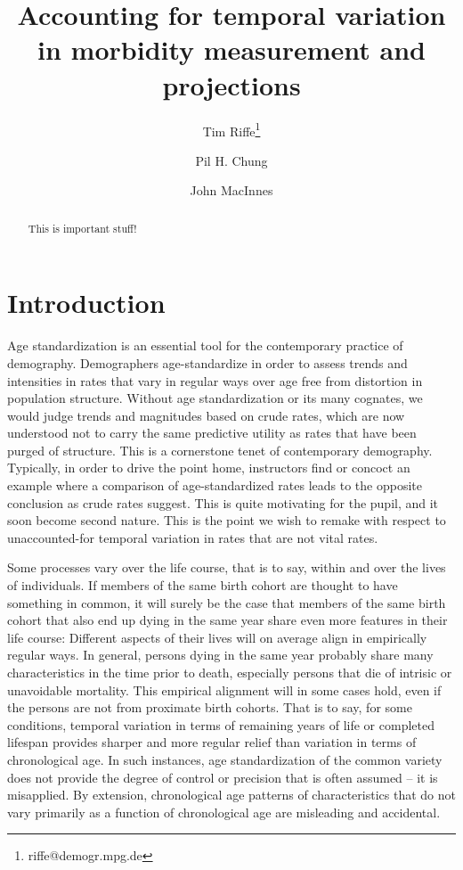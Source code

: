 \documentclass[11pt,oneside,a4paper]{article} %
\begin{document}
\title{Accounting for temporal variation in morbidity measurement
and projections}

\author[1]{Tim Riffe\thanks{riffe@demogr.mpg.de}}
\author[2]{Pil H. Chung}
\author[3]{John MacInnes}


\maketitle

\begin{abstract}
This is important stuff!
\end{abstract}


\section*{Introduction}
Age standardization is an essential tool for the contemporary practice of
demography. Demographers age-standardize in order to assess trends and
intensities in rates that vary in regular ways over age free from distortion in
population structure. Without age standardization or its many cognates, we
would judge trends and magnitudes based on crude rates, which are now understood
not to carry the same predictive utility as rates that have been purged of
structure. This is a cornerstone tenet of contemporary demography. Typically, in
order to drive the point home, instructors find or concoct an example where a
comparison of age-standardized rates leads to the opposite conclusion as crude
rates suggest. This is quite motivating for the pupil, and it soon become second
nature. This is the point we wish to remake with respect to unaccounted-for
temporal variation in rates that are not vital rates.

Some processes vary over the life course, that is to say, within and over the
lives of individuals. If members of the same birth cohort are thought to have
something in common, it will surely be the case that members of the same birth
cohort that also end up dying in the same year share even more features in their
life course: Different aspects of their lives will on average align in
empirically regular ways. In general, persons dying in the same year probably
share many characteristics in the time prior to death, especially persons that
die of intrisic or unavoidable mortality. This empirical
alignment will in some cases hold, even if the persons are not from proximate
birth cohorts. That is to say, for some conditions, temporal variation in terms
of remaining years of life or completed lifespan provides sharper and more
regular relief than variation in terms of chronological age. In such instances,
age standardization of the common variety does not provide the degree of
control or precision that is often assumed -- it is misapplied. By extension,
chronological age patterns of characteristics that do not vary primarily as a
function of chronological age are misleading and accidental. 
\end{document}
